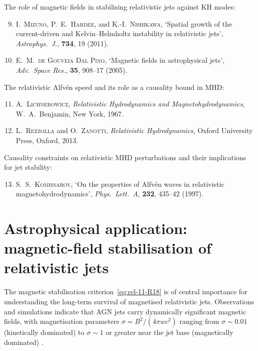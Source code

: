 \medskip\noindent
The role of magnetic fields in stabilising relativistic jets against KH
modes:

\begin{enumerate}
\setcounter{enumi}{8}
\item \textsc{I.\ Mizuno}, \textsc{P.\ E.\ Hardee}, and
  \textsc{K.-I.\ Nishikawa}, `Spatial growth of the current-driven and
  Kelvin--Helmholtz instability in relativistic jets',
  \emph{Astrophys.\ J.}, \textbf{734}, 19 (2011).

\item \textsc{E.\ M.\ de Gouveia Dal Pino}, `Magnetic fields in
  astrophysical jets', \emph{Adv.\ Space Res.}, \textbf{35},
  908--17 (2005).
\end{enumerate}

\medskip\noindent
The relativistic Alfv\'en speed and its role as a causality bound in
MHD:

\begin{enumerate}
\setcounter{enumi}{10}
\item \textsc{A.\ Lichnerowicz}, \emph{Relativistic Hydrodynamics and
  Magnetohydrodynamics}, W.\ A.\ Benjamin, New York, 1967.

\item \textsc{L.\ Rezzolla} and \textsc{O.\ Zanotti},
  \emph{Relativistic Hydrodynamics}, Oxford University Press, Oxford,
  2013.
\end{enumerate}

\medskip\noindent
Causality constraints on relativistic MHD perturbations and their
implications for jet stability:

\begin{enumerate}
\setcounter{enumi}{12}
\item \textsc{S.\ S.\ Komissarov}, `On the properties of Alfv\'en
  waves in relativistic magnetohydrodynamics',
  \emph{Phys.\ Lett.\ A}, \textbf{232}, 435--42 (1997).

\end{enumerate}

\section*{Astrophysical application: magnetic-field stabilisation of relativistic jets}
\label{sec:rel-11-105-106-app}

The magnetic stabilisation criterion~\eqref{eq:rel-11-R18} is of
central importance for understanding the long-term survival of
magnetised relativistic jets.  Observations and simulations indicate
that AGN jets carry dynamically significant magnetic fields, with
magnetisation parameters $\sigma = B^{2}/(4\pi w c^{2})$ ranging
from $\sigma \sim 0.01$ (kinetically dominated) to $\sigma \sim 1$
or greater near the jet base (magnetically dominated)
\cite{MizunoHardeeNishikawa2007, MizunoEtAl2011, BodoEtAl2013}.


